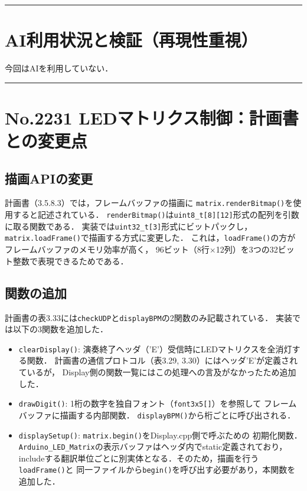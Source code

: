 \documentclass[uplatex,dvipdfmx,a4paper,11pt]{jsarticle}
\newcommand{\sectionrule}{\par\medskip\noindent\rule{\linewidth}{0.6pt}\par\medskip}
\begin{document}
\sectionrule


\section{AI利用状況と検証（再現性重視）}

今回はAIを利用していない．

\sectionrule


\section{No.2231 LEDマトリクス制御：計画書との変更点}

\subsection{描画APIの変更}

計画書（3.5.8.3）では，フレームバッファの描画に
\texttt{matrix.renderBitmap()}を使用すると記述されている．
\texttt{renderBitmap()}は\texttt{uint8\_t[8][12]}形式の配列を引数に取る関数である．
実装では\texttt{uint32\_t[3]}形式にビットパックし，
\texttt{matrix.loadFrame()}で描画する方式に変更した．
これは，\texttt{loadFrame()}の方がフレームバッファのメモリ効率が高く，
96ビット（8行$\times$12列）を3つの32ビット整数で表現できるためである．

\subsection{関数の追加}

計画書の表3.33には\texttt{checkUDP}と\texttt{displayBPM}の2関数のみ記載されている．
実装では以下の3関数を追加した．

\begin{itemize}
  \item \texttt{clearDisplay()}: 演奏終了ヘッダ（'E'）受信時にLEDマトリクスを全消灯する関数．
  計画書の通信プロトコル（表3.29, 3.30）にはヘッダ'E'が定義されているが，
  Display側の関数一覧にはこの処理への言及がなかったため追加した．

  \item \texttt{drawDigit()}: 1桁の数字を独自フォント（\texttt{font3x5[]}）を参照して
  フレームバッファに描画する内部関数．
  \texttt{displayBPM()}から桁ごとに呼び出される．

  \item \texttt{displaySetup()}: \texttt{matrix.begin()}をDisplay.cpp側で呼ぶための
  初期化関数．\texttt{Arduino\_LED\_Matrix}の表示バッファはヘッダ内でstatic定義されており，
  includeする翻訳単位ごとに別実体となる．そのため，描画を行う\texttt{loadFrame()}と
  同一ファイルから\texttt{begin()}を呼び出す必要があり，本関数を追加した．
\end{itemize}
\end{document}
